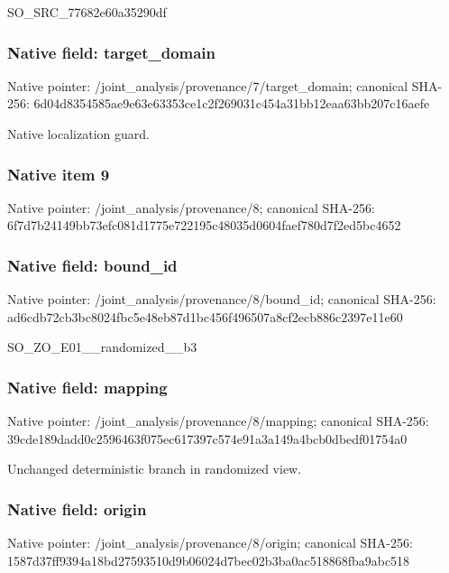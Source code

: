 \documentclass[10pt,a4paper]{article}
\begin{document}
\begingroup\raggedright\sloppy SO\_\allowbreak{}SRC\_\allowbreak{}77682e60a35290df\par\endgroup

\subsubsection{Native field: target\_\allowbreak{}domain}
Native pointer: /joint\_\allowbreak{}analysis/provenance/7/target\_\allowbreak{}domain; canonical SHA-256: 6d04d8354585ae9e63e63353ce1c2f269031c454a31bb12eaa63bb207c16aefe

\begingroup\raggedright\sloppy Native localization guard.\par\endgroup

\subsubsection{Native item 9}
Native pointer: /joint\_\allowbreak{}analysis/provenance/8; canonical SHA-256: 6f7d7b24149bb73efc081d1775e722195c48035d0604faef780d7f2ed5bc4652

\subsubsection{Native field: bound\_\allowbreak{}id}
Native pointer: /joint\_\allowbreak{}analysis/provenance/8/bound\_\allowbreak{}id; canonical SHA-256: ad6cdb72cb3bc8024fbc5e48eb87d1bc456f496507a8cf2ecb886c2397e11e60

\begingroup\raggedright\sloppy SO\_\allowbreak{}ZO\_\allowbreak{}E01\_\allowbreak{}\_\allowbreak{}randomized\_\allowbreak{}\_\allowbreak{}b3\par\endgroup

\subsubsection{Native field: mapping}
Native pointer: /joint\_\allowbreak{}analysis/provenance/8/mapping; canonical SHA-256: 39cde189dadd0c2596463f075ec617397c574e91a3a149a4bcb0dbedf01754a0

\begingroup\raggedright\sloppy Unchanged deterministic branch in randomized view.\par\endgroup

\subsubsection{Native field: origin}
Native pointer: /joint\_\allowbreak{}analysis/provenance/8/origin; canonical SHA-256: 1587d37ff9394a18bd27593510d9b06024d7bec02b3ba0ac518868fba9abc518
\end{document}
